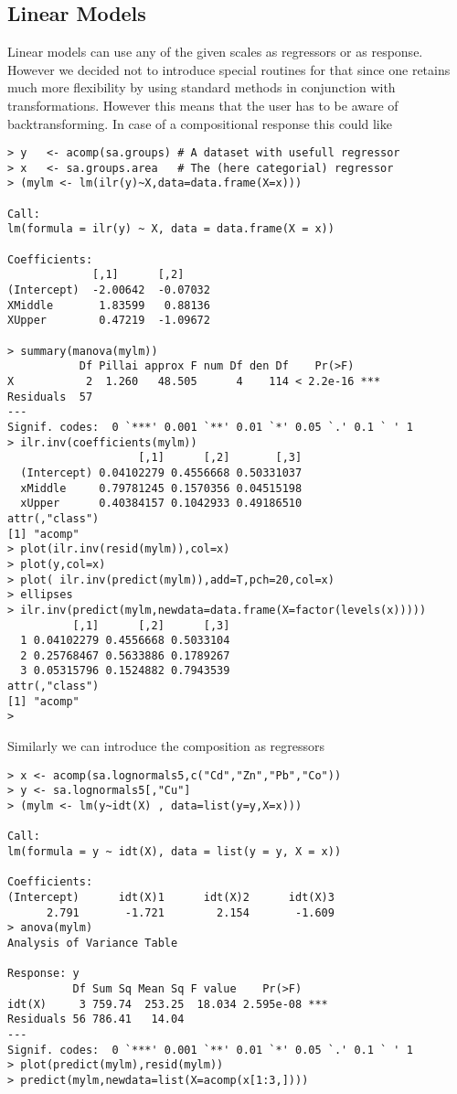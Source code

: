 \documentclass{article}
\begin{document}
\subsection{Linear Models}
Linear models can use any of the given scales as regressors or as response.
However we decided not to introduce special routines for that since one
retains much more flexibility by using standard methods in conjunction with
transformations. However this means that the user has to be aware of
backtransforming. In case of a compositional response this could like
\begin{verbatim}
> y   <- acomp(sa.groups) # A dataset with usefull regressor
> x   <- sa.groups.area   # The (here categorial) regressor
> (mylm <- lm(ilr(y)~X,data=data.frame(X=x)))

Call:
lm(formula = ilr(y) ~ X, data = data.frame(X = x))

Coefficients:
             [,1]      [,2]    
(Intercept)  -2.00642  -0.07032
XMiddle       1.83599   0.88136
XUpper        0.47219  -1.09672

> summary(manova(mylm))
           Df Pillai approx F num Df den Df    Pr(>F)    
X           2  1.260   48.505      4    114 < 2.2e-16 ***
Residuals  57                                            
---
Signif. codes:  0 `***' 0.001 `**' 0.01 `*' 0.05 `.' 0.1 ` ' 1 
> ilr.inv(coefficients(mylm))
                    [,1]      [,2]       [,3]
  (Intercept) 0.04102279 0.4556668 0.50331037
  xMiddle     0.79781245 0.1570356 0.04515198
  xUpper      0.40384157 0.1042933 0.49186510
attr(,"class")
[1] "acomp"
> plot(ilr.inv(resid(mylm)),col=x)
> plot(y,col=x)
> plot( ilr.inv(predict(mylm)),add=T,pch=20,col=x)
> ellipses
> ilr.inv(predict(mylm,newdata=data.frame(X=factor(levels(x)))))
          [,1]      [,2]      [,3]
  1 0.04102279 0.4556668 0.5033104
  2 0.25768467 0.5633886 0.1789267
  3 0.05315796 0.1524882 0.7943539
attr(,"class")
[1] "acomp"
> 
\end{verbatim}
Similarly we can introduce the composition as regressors 
\begin{verbatim}
> x <- acomp(sa.lognormals5,c("Cd","Zn","Pb","Co"))
> y <- sa.lognormals5[,"Cu"]
> (mylm <- lm(y~idt(X) , data=list(y=y,X=x)))

Call:
lm(formula = y ~ idt(X), data = list(y = y, X = x))

Coefficients:
(Intercept)      idt(X)1      idt(X)2      idt(X)3  
      2.791       -1.721        2.154       -1.609  
> anova(mylm)
Analysis of Variance Table

Response: y
          Df Sum Sq Mean Sq F value    Pr(>F)    
idt(X)     3 759.74  253.25  18.034 2.595e-08 ***
Residuals 56 786.41   14.04                      
---
Signif. codes:  0 `***' 0.001 `**' 0.01 `*' 0.05 `.' 0.1 ` ' 1 
> plot(predict(mylm),resid(mylm))
> predict(mylm,newdata=list(X=acomp(x[1:3,])))
\end{verbatim}
\end{document}
